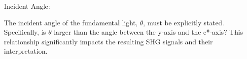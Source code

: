 Incident Angle:

The incident angle of the fundamental light, $\theta$, must be explicitly stated. Specifically, is $\theta$ larger than the angle between the y-axis and the c*-axis? This relationship significantly impacts the resulting SHG signals and their interpretation.

